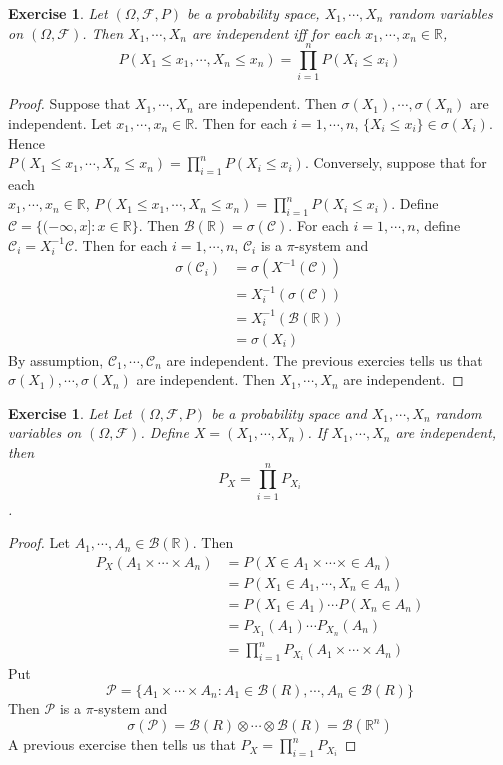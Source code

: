 \documentclass[12pt]{amsart}
\newtheorem{ex}[thm]{Exercise}
\newcommand{\sig}{\sigma}
\newcommand{\Om}{\Omega}
\newcommand{\R}{\mathbb{R}}
\newcommand{\MC}{\mathcal{C}}
\newcommand{\MB}{\mathcal{B}}
\newcommand{\MF}{\mathcal{F}}
\newcommand{\MP}{\mathcal{P}}
\begin{document}
\begin{ex}
	Let $(\Om, \MF, P)$ be a probability space, $X_1, \cdots, X_n$ random variables on $(\Om, \MF)$. Then $X_1, \cdots, X_n$ are independent iff for each $x_1, \cdots, x_n \in \R$, $$P(X_1 \leq x_1, \cdots, X_n \leq x_n ) = \prod_{i=1}^nP(X_i \leq x_i)$$
\end{ex}

\begin{proof}
	Suppose that $X_1, \cdots, X_n$ are independent. Then $\sig(X_1), \cdots, \sig(X_n)$ are independent. Let $x_1, \cdots, x_n \in \R$. Then for each $i=1, \cdots, n$, $\{X_i \leq x_i\} \in \sigma(X_i)$. Hence \\$P(X_1 \leq x_1, \cdots, X_n \leq x_n ) = \prod\limits_{i=1}^nP(X_i \leq x_i)$. Conversely, suppose that for each \\$x_1, \cdots, x_n \in \R$, $P(X_1 \leq x_1, \cdots, X_n \leq x_n ) = \prod\limits_{i=1}^nP(X_i \leq x_i)$. Define $\MC = \{ (-\infty, x]: x \in \R \}$. Then $\MB(\R) = \sig(\MC)$. For each $i =1, \cdots, n$, define $\MC_i = X_i^{-1}\MC$. Then for each $i =1, \cdots, n$, $\MC_i$ is a $\pi$-system and 
	\begin{align*}
		\sig(\MC_i) 
		&= \sig(X^{-1}(\MC)) \\
		&= X_i^{-1}(\sig(\MC)) \\
		&= X_i^{-1}(\MB(\R)) \\
		&= \sig(X_i)
	\end{align*}
	By assumption, $\MC_1, \cdots, \MC_n$ are independent. The previous exercies tells us that $\sig(X_1), \cdots, \sig(X_n)$ are independent. Then $X_1, \cdots, X_n$ are independent. 
\end{proof}

\begin{ex}
	Let Let $(\Om, \MF, P)$ be a probability space and $X_1, \cdots, X_n$ random variables on $(\Om, \MF)$. Define $X = (X_1, \cdots, X_n)$. If $X_1, \cdots, X_n$ are independent, then $$P_{X} = \prod\limits_{i=1}^nP_{X_i}$$.
\end{ex}

\begin{proof}
	Let $A_1, \cdots, A_n \in \MB(\R)$. Then 
	\begin{align*}
		P_X(A_1 \times \cdots \times A_n) 
		&= P(X \in A_1 \times \cdots \times \in A_n)\\
		&= P(X_1 \in A_1, \cdots, X_n \in A_n) \\
		&= P(X_1 \in A_1) \cdots P(X_n \in A_n) \\
		&= P_{X_1}(A_1) \cdots P_{X_n}(A_n) \\
		&= \prod_{i=1}^nP_{X_i}(A_1 \times \cdots \times  A_n)
	\end{align*}
	Put $$\MP = \{ A_1 \times \cdots \times A_n: A_1 \in \MB(R), \cdots, A_n \in \MB(R) \}$$ Then $\MP$ is a $\pi$-system and $$\sig(\MP) = \MB(R) \otimes \cdots \otimes \MB(R) = \MB(\R^n)$$
	A previous exercise then tells us that $P_X = \prod\limits_{i=1}^nP_{X_i}$ 
\end{proof}
\end{document}
